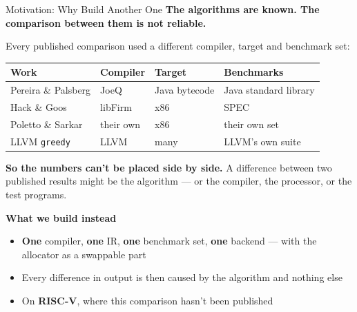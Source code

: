 \documentclass[aspectratio=169,11pt]{beamer}
\begin{document}
\begin{frame}{Motivation: Why Build Another One}
{\small\textbf{The algorithms are known. The comparison between them is not reliable.}}\par\vspace{2mm}
{\scriptsize Every published comparison used a different compiler, target and
benchmark set:}\par\vspace{1.5mm}
\centering
{\scriptsize
\begin{tabular}{@{}p{3.4cm}p{2.2cm}p{2.6cm}p{4.0cm}@{}}
\toprule
Work & Compiler & Target & Benchmarks \\
\midrule
Pereira \& Palsberg & JoeQ      & Java bytecode & Java standard library \\
Hack \& Goos        & libFirm   & x86           & SPEC \\
Poletto \& Sarkar   & their own & x86           & their own set \\
LLVM \texttt{greedy}& LLVM      & many          & LLVM's own suite \\
\bottomrule
\end{tabular}}\par\vspace{3mm}
\begin{minipage}{0.92\textwidth}\scriptsize
\textbf{So the numbers can't be placed side by side.} A difference between two
published results might be the algorithm --- or the compiler, the processor, or
the test programs.
\end{minipage}\par\vspace{2.5mm}
\begin{minipage}{0.92\textwidth}
{\small\textbf{What we build instead}}
\begin{itemize}\scriptsize
  \item \textbf{One} compiler, \textbf{one} IR, \textbf{one} benchmark set,
        \textbf{one} backend --- with the allocator as a swappable part
  \item Every difference in output is then caused by the algorithm and nothing else
  \item On \textbf{RISC-V}, where this comparison hasn't been published
\end{itemize}
\end{minipage}
\end{frame}
\end{document}

